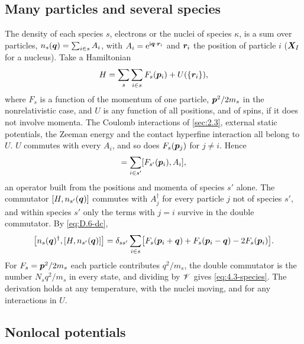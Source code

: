 \subsection*{Many particles and several species}

The density of each species $s$, electrons or the nuclei of species $\kappa$, is a sum over particles, $n_s(\bm{q}) = \sum_{i\in s}A_i$, with $A_i = \mathrm{e}^{\mathrm{i}\bm{q}\cdot\bm{r}_i}$ and $\bm{r}_i$ the position of particle $i$ ($\bm{X}_I$ for a nucleus). Take a Hamiltonian
\begin{equation}
  H = \sum_s\sum_{i\in s}F_s(\bm{p}_i) + U(\{\bm{r}_i\}) ,
  \label{eq:D.6-H}
\end{equation}
where $F_s$ is a function of the momentum of one particle, $\bm{p}^2/2m_s$ in the nonrelativistic case, and $U$ is any function of all positions, and of spins, if it does not involve momenta. The Coulomb interactions of \cref{sec:2.3}, external static potentials, the Zeeman energy and the contact hyperfine interaction all belong to $U$. $U$ commutes with every $A_i$, and so does $F_s(\bm{p}_j)$ for $j \ne i$. Hence
\begin{equation*}
  [H, n_{s'}(\vect{q})] = \sum_{i\in s'}[F_{s'}(\vect{p}_i), A_i] ,
\end{equation*}
an operator built from the positions and momenta of species $s'$ alone. The commutator $[H, n_{s'}(\bm{q})]$ commutes with $A_j^\dagger$ for every particle $j$ not of species $s'$, and within species $s'$ only the terms with $j = i$ survive in the double commutator. By \cref{eq:D.6-dc},
\begin{equation}
  \bigl[n_s(\bm{q})^\dagger, [H, n_{s'}(\bm{q})]\bigr] = \delta_{ss'}\sum_{i\in s}\bigl[F_s(\bm{p}_i + \bm{q}) + F_s(\bm{p}_i - \bm{q}) - 2F_s(\bm{p}_i)\bigr] .
  \label{eq:D.6-species}
\end{equation}
For $F_s = \bm{p}^2/2m_s$ each particle contributes $q^2/m_s$, the double commutator is the number $N_sq^2/m_s$ in every state, and dividing by $\mathscr{V}$ gives \cref{eq:4.3-species}. The derivation holds at any temperature, with the nuclei moving, and for any interactions in $U$.

\subsection*{Nonlocal potentials}

